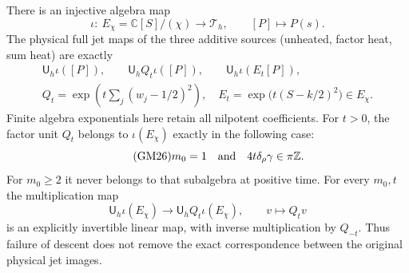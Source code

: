 \begin{theorem}
There is an injective algebra map
\begin{equation}\tag{GM24}
 \iota:\ E_\chi=\mathbb C[S]/(\chi)\longrightarrow\mathcal T_h,
                 \qquad[P]\longmapsto P(s).
\end{equation}
The physical full jet maps of the three additive sources (unheated,
factor heat, sum heat) are exactly
\begin{equation}\tag{GM25}
 \begin{gathered}
 \mathsf U_h\iota([P]),\qquad
 \mathsf U_h Q_t\iota([P]),\qquad
 \mathsf U_h\iota(E_t[P]),\\
 Q_t=\exp\!\left(t\sum_j(w_j-1/2)^2\right),\quad
 E_t=\exp\bigl(t(S-k/2)^2\bigr)\in E_\chi.
 \end{gathered}
\end{equation}
Finite algebra exponentials here retain all nilpotent coefficients.
For $t>0$, the factor unit $Q_t$ belongs to $\iota(E_\chi)$ exactly
in the following case:
\begin{equation}\tag{GM26}
 m_0=1\quad\hbox{and}\quad4t\delta_\rho\gamma\in\pi\mathbb Z.
\end{equation}
For $m_0\geq2$ it never belongs to that subalgebra at positive time.
For every $m_0,t$ the multiplication map
\begin{equation}\tag{GM27}
 \mathsf U_h\iota(E_\chi)\longrightarrow
                  \mathsf U_h Q_t\iota(E_\chi),\qquad v\longmapsto Q_tv
\end{equation}
is an explicitly invertible linear map, with inverse multiplication
by $Q_{-t}$.  Thus failure of descent does not remove the exact
correspondence between the original physical jet images.
\end{theorem}
